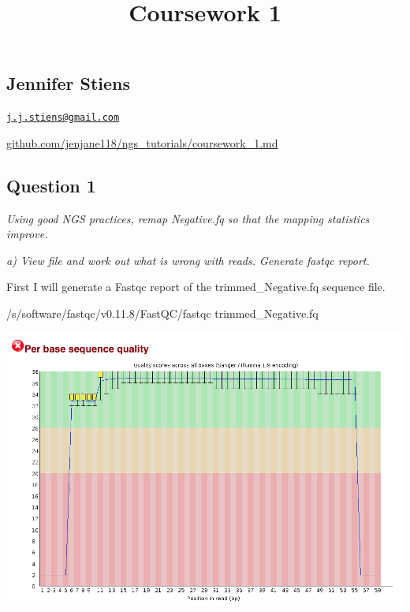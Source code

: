 \documentclass[]{article}
\title{Coursework 1}
\author{}
\date{}
\newenvironment{Shaded}{\begin{snugshade}}{\end{snugshade}}
\newcommand{\ExtensionTok}[1]{#1}
\newcommand{\NormalTok}[1]{#1}
\begin{document}
\maketitle

\subsection{Jennifer Stiens}\label{jennifer-stiens}

\href{mailto:j.j.stiens@gmail.com}{\nolinkurl{j.j.stiens@gmail.com}}

\href{https://github.com/jenjane118/ngs_tutorials}{github.com/jenjane118/ngs\_tutorials/coursework\_1.md}

\subsection{Question 1}\label{question-1}

\emph{Using good NGS practices, remap Negative.fq so that the mapping
statistics improve.}

\emph{a) View file and work out what is wrong with reads. Generate
fastqc report.}

First I will generate a Fastqc report of the trimmed\_Negative.fq
sequence file.

\begin{Shaded}
\begin{Highlighting}[]
\ExtensionTok{/s/software/fastqc/v0.11.8/FastQC/fastqc}\NormalTok{ trimmed_Negative.fq}
\end{Highlighting}
\end{Shaded}

\includegraphics{trimmed_Negative_fastqc.png}
\end{document}
